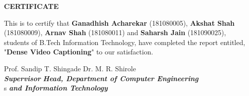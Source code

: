 \begin{center}
    {\textbf{CERTIFICATE}}\\ \vspace{1cm}
\end{center}
This is to certify that \textbf{Ganadhish Acharekar} (181080005), \textbf{Akshat Shah} (181080009), \textbf{Arnav Shah} (181080011) and \textbf{Saharsh Jain} (181090025), students of B.Tech Information Technology, have completed the report entitled, "\textbf{Dense Video Captioning}" to our satisfaction.

\vspace{2cm}
Prof. Sandip T. Shingade
\hfill
Dr. M. R. Shirole \\
\indent \textit{\textbf{Supervisor}}
\hfill
\textit{\textbf{Head, Department of Computer Engineering}} \\
\color{white} s
\hfill
\color{black}\textit{\textbf{and Information Technology}} \par

 \par